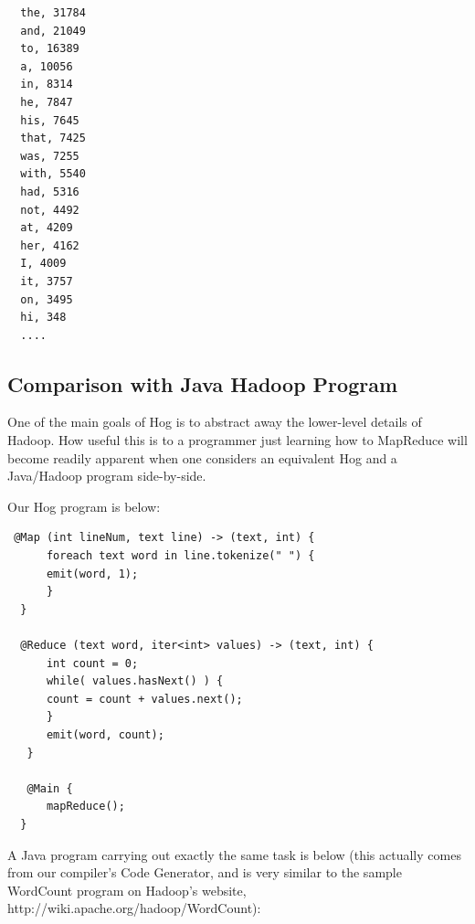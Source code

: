 \documentclass{report}
\begin{document}
\begin{verbatim}
  the, 31784
  and, 21049
  to, 16389
  a, 10056
  in, 8314
  he, 7847
  his, 7645
  that, 7425
  was, 7255
  with, 5540
  had, 5316
  not, 4492
  at, 4209
  her, 4162
  I, 4009
  it, 3757
  on, 3495
  hi, 348
  ....
\end{verbatim}

\subsection{Comparison with Java Hadoop Program}

One of the main goals of Hog is to abstract away the lower-level details of Hadoop. How useful this is to a programmer just learning how to MapReduce will become readily apparent when one considers an equivalent Hog and a Java/Hadoop program side-by-side.

Our Hog program is below:
\begin{verbatim}
 @Map (int lineNum, text line) -> (text, int) {
      foreach text word in line.tokenize(" ") {
	  emit(word, 1);
      }
  }

  @Reduce (text word, iter<int> values) -> (text, int) {
      int count = 0;
      while( values.hasNext() ) {
	  count = count + values.next();
      }
      emit(word, count);
   }

   @Main {
      mapReduce();
  }
\end{verbatim}      

A Java program carrying out exactly the same task is below (this actually comes from our compiler's Code Generator, and is very similar to the sample WordCount program on Hadoop's website, http://wiki.apache.org/hadoop/WordCount):
\end{document}
